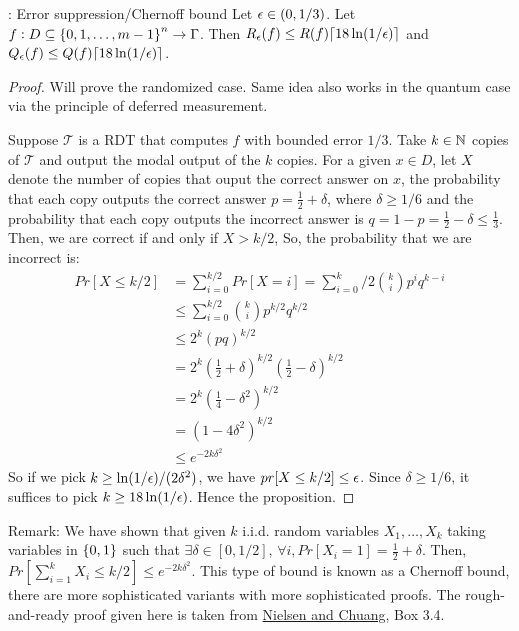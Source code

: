 \begin{propbox}{: Error suppression/Chernoff bound}
    Let $\epsilon \in (0, 1/3)$. Let $f: D \subseteq \set{0, 1, \ldots, m-1}^n \to \Gamma$. Then $R_\epsilon(f) \leq R(f)\lceil 18\ln(1/\epsilon)\rceil$ and $Q_\epsilon(f) \leq Q(f)\lceil 18\ln(1/\epsilon)\rceil$.
\end{propbox}
\begin{proof}
    Will prove the randomized case. Same idea also works in the quantum case via the principle of deferred measurement.

    Suppose $\mathcal{T}$ is a RDT that computes $f$ with bounded error $1/3$. Take $k \in \mathbb{N}$ copies of $\mathcal{T}$ and output the modal output of the $k$ copies. For a given $x \in D$, let $X$ denote the number of copies that ouput the correct answer on $x$, the probability that each copy outputs the correct answer $p = \frac{1}{2} + \delta$, where $\delta \geq 1/6$ and the probability that each copy outputs the incorrect answer is $q = 1-p = \frac{1}{2} - \delta \leq \frac{1}{3}$. Then, we are correct if and only if $X > k/2$, So, the probability that we are incorrect is:
    \begin{align*}
        Pr[X\leq k/2] &= \sum_{i=0}^{k/2}Pr[X=i] = \sum_{i=0}^k/2\binom{k}{i}p^iq^{k-i}
        \\ &\leq \sum_{i=0}^{k/2} \binom{k}{i}p^{k/2}q^{k/2}
        \\ &\leq 2^k(pq)^{k/2}
        \\ &= 2^k\left(\frac{1}{2} + \delta\right)^{k/2}\left(\frac{1}{2}-\delta\right)^{k/2}
        \\ &= 2^k\left(\frac{1}{4} - \delta^2\right)^{k/2}
        \\ &= (1-4\delta^2)^{k/2}
        \\ &\leq e^{-2k\delta^2}
    \end{align*}
    So if we pick $k \geq \ln(1/\epsilon)/(2\delta^2)$, we have $pr[X \leq k/2] \leq \epsilon$. Since $\delta \geq 1/6$, it suffices to pick $k \geq 18\ln(1/\epsilon)$. Hence the proposition.
\end{proof}

Remark: We have shown that given $k$ i.i.d. random variables $X_1, \ldots, X_k$ taking variables in $\set{0, 1}$ such that $\exists \delta \in [0, 1/2]$, $\forall i, Pr[X_i = 1] = \frac{1}{2} + \delta$. Then, $Pr[\sum_{i=1}^k X_i \leq k/2] \leq e^{-2k\delta^2}$. This type of bound is known as a Chernoff bound,  there are more sophisticated variants with more sophisticated proofs. The rough-and-ready proof given here is taken from \href{https://www.cambridge.org/highereducation/books/quantum-computation-and-quantum-information/01E10196D0A682A6AEFFEA52D53BE9AE#overview}{Nielsen and Chuang}, Box 3.4.